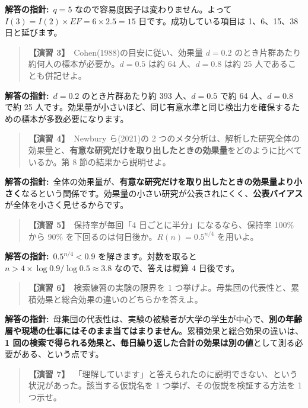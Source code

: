 \documentclass{article}
\begin{document}
\textbf{解答の指針:}\ \(q = 5\) なので容易度因子は変わりません。よって \(I(3) = I(2) \times EF = 6 \times 2.5 = 15\) 日です。成功している項目は 1、6、15、38 日と延びます。

\begin{quote}
\textbf{【演習 3】}\ Cohen(1988)の目安に従い、効果量 \(d = 0.2\) のとき片群あたり約何人の標本が必要か。\(d = 0.5\) は約 64 人、\(d = 0.8\) は約 25 人であることも併記せよ。
\end{quote}

\textbf{解答の指針:}\ \(d = 0.2\) のとき片群あたり約 393 人、\(d = 0.5\) で約 64 人、\(d = 0.8\) で約 25 人です。効果量が小さいほど、同じ有意水準と同じ検出力を確保するための標本が多数必要になります。

\begin{quote}
\textbf{【演習 4】}\ Newbury ら(2021)の 2 つのメタ分析は、解析した研究全体の効果量と、\textbf{有意な研究だけを取り出したときの効果量}をどのように比べているか。第 8 節の結果から説明せよ。
\end{quote}

\textbf{解答の指針:}\ 全体の効果量が、\textbf{有意な研究だけを取り出したときの効果量より小さく}なるという関係です。効果量の小さい研究が公表されにくく、\textbf{公表バイアス}が全体を小さく見せるからです。

\begin{quote}
\textbf{【演習 5】}\ 保持率が毎回「4 日ごとに半分」になるなら、保持率 100\% から 90\% を下回るのは何日後か。\(R(n) = 0.5^{n/4}\) を用いよ。
\end{quote}

\textbf{解答の指針:}\ \(0.5^{n/4} < 0.9\) を解きます。対数を取ると \(n > 4 \times \log 0.9 / \log 0.5 \approx 3.8\) なので、答えは概算 4 日後です。

\begin{quote}
\textbf{【演習 6】}\ 検索練習の実験の限界を 1 つ挙げよ。母集団の代表性と、累積効果と総合効果の違いのどちらかを答えよ。
\end{quote}

\textbf{解答の指針:}\ 母集団の代表性は、実験の被験者が大学の学生が中心で、\textbf{別の年齢層や現場の仕事にはそのまま当てはまりません}。累積効果と総合効果の違いは、\textbf{1 回の検索で得られる効果と、毎日繰り返した合計の効果は別の値}として測る必要がある、という点です。

\begin{quote}
\textbf{【演習 7】}\ 「理解しています」と答えられたのに説明できない、という状況があった。該当する仮説名を 1 つ挙げ、その仮説を検証する方法を 1 つ示せ。
\end{quote}
\end{document}
